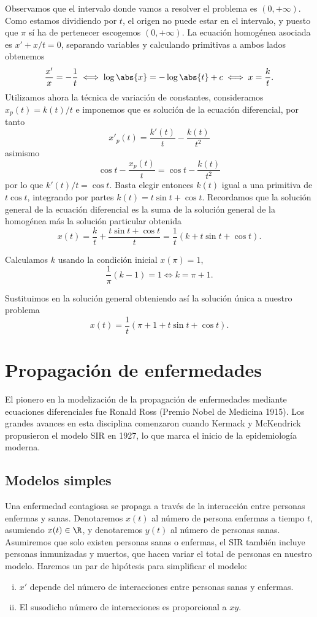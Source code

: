 \documentclass[../ecuaciones_diferenciales.tex]{subfiles}
\begin{document}
\begin{solution}
	Observamos que el intervalo donde vamos a resolver el problema es
	\((0, +\infty)\). Como estamos dividiendo por \(t\), el origen no puede
	estar en el intervalo, y puesto que \(\pi\) sí ha de pertenecer escogemos
	\((0, +\infty)\). La ecuación homogénea asociada es \(x' + x/t = 0\),
	separando variables y calculando primitivas a ambos lados obtenemos
	\[\frac{x'}{x} = -\frac{1}{t} \iff \log\abs{x}
		= -\log\abs{t} + c \iff x = \frac{k}{t}.\]
	Utilizamos ahora la técnica de variación de constantes, consideramos
	\(x_p(t) = k(t)/t\) e imponemos que es solución de la ecuación diferencial,
	por tanto
	\[x'_p(t) = \frac{k'(t)}{t} - \frac{k(t)}{t^2}\]
	asimismo
	\[\cos t - \frac{x_p(t)}{t} = \cos t - \frac{k(t)}{t^2}\]
	por lo que \(k'(t)/t = \cos t\). Basta elegir entonces \(k(t)\) igual a una
	primitiva de \(t \cos t\), integrando por partes
	\(k(t) = t \sin t + \cos t\). Recordamos que la solución general de la
	ecuación diferencial es la suma de la solución general de la homogénea más
	la solución particular obtenida
	\[x(t) = \frac{k}{t} + \frac{t \sin t + \cos t}{t}
		= \frac{1}{t}(k + t \sin t + \cos t).\]

	Calculamos \(k\) usando la condición inicial \(x(\pi) = 1\),
	\[\frac{1}{\pi}(k - 1) = 1 \iff k = \pi + 1.\]

	Sustituimos en la solución general obteniendo así la solución única a
	nuestro problema
	\[x(t) = \frac{1}{t}(\pi + 1 + t \sin t + \cos t).\]
\end{solution}

\section{Propagación de enfermedades}

El pionero en la modelización de la propagación de enfermedades mediante
ecuaciones diferenciales fue Ronald Ross (Premio Nobel de Medicina 1915). Los
grandes avances en esta disciplina comenzaron cuando Kermack y McKendrick
propusieron el modelo SIR en 1927, lo que marca el inicio de la
epidemiología moderna.

\subsection{Modelos simples}

Una enfermedad contagiosa se propaga a través de la interacción entre personas
enfermas y sanas. Denotaremos \(x(t)\) al número de persona enfermas a tiempo
\(t\), asumiendo \(x(t) \in \R\), y denotaremos \(y(t)\) al número de personas
sanas. Asumiremos que solo existen personas sanas o enfermas, el SIR también
incluye personas inmunizadas y muertos, que hacen variar el total de personas en
nuestro modelo. Haremos un par de hipótesis para simplificar el modelo:
\begin{enumerate}[i)]
	\item \(x'\) depende del número de interacciones entre personas sanas y
	      enfermas.

	\item El susodicho número de interacciones es proporcional a \(xy\).
\end{enumerate}
\end{document}
